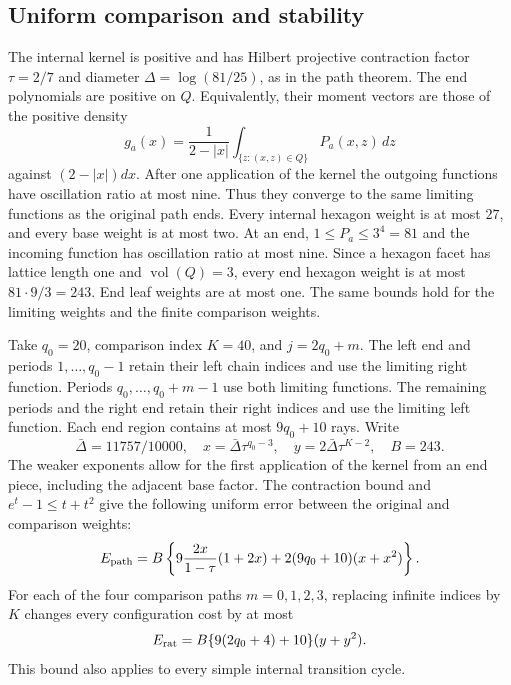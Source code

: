 \subsection{Uniform comparison and stability}
The internal kernel is positive and has Hilbert projective contraction
factor $\tau=2/7$ and diameter $\Delta=\log(81/25)$, as in the path theorem.
The end polynomials are positive on $Q$. Equivalently, their moment
vectors are those of the positive density
\[
 g_a(x)=\frac{1}{2-|x|}\int_{\{z:(x,z)\in Q\}}P_a(x,z)\,dz
\]
against $(2-|x|)dx$. After one application of the kernel the outgoing
functions have oscillation ratio at most nine.
Thus they converge to the same limiting functions as the original path
ends. Every internal hexagon weight is at most $27$, and every base
weight is at most two. At an end, $1\le P_a\le3^4=81$ and the incoming
function has oscillation ratio at most nine. Since a hexagon facet has
lattice length one and $\operatorname{vol}(Q)=3$, every end hexagon
weight is at most $81\cdot9/3=243$. End leaf weights are at most one.
The same bounds hold for the limiting weights and the finite comparison
weights.

Take $q_0=20$, comparison index $K=40$, and $j=2q_0+m$.
The left end and periods $1,\ldots,q_0-1$ retain their left chain
indices and use the limiting right function. Periods
$q_0,\ldots,q_0+m-1$ use both limiting functions. The remaining
periods and the right end retain their right indices and use the
limiting left function. Each end region contains at most $9q_0+10$ rays. Write
\[
 \bar\Delta=11757/10000,\quad x=\bar\Delta\tau^{q_0-3},\quad
 y=2\bar\Delta\tau^{K-2},\quad B=243.
\]
The weaker exponents allow for the first application of the kernel
from an end piece, including the adjacent base factor. The contraction
bound and $e^t-1\le t+t^2$ give the following uniform error between the
original and comparison weights:
\[
 E_{\rm path}=B\left\{9\frac{2x}{1-\tau}(1+2x)
                    +2(9q_0+10)(x+x^2)\right\}.
\]
For each of the four comparison paths $m=0,1,2,3$, replacing infinite
indices by $K$ changes every configuration cost by at most
\[
 E_{\rm rat}=B\{9(2q_0+4)+10\}(y+y^2).
\]
This bound also applies to every simple internal transition cycle.

